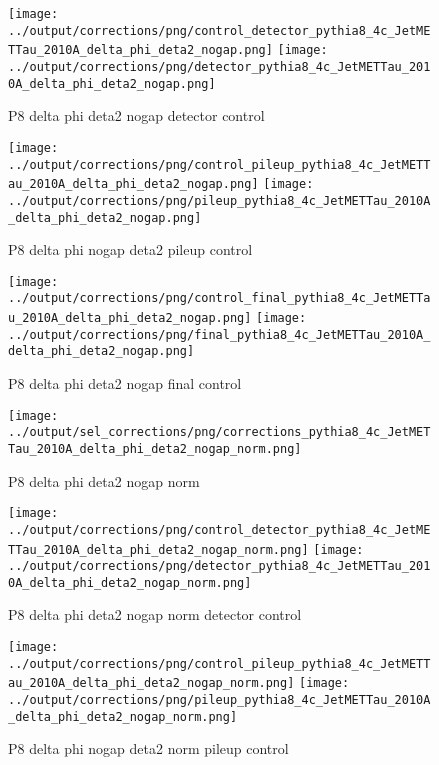 \documentclass[11pt]{book}
\begin{document}
\begin{figure}[ht]
\centering
\texttt{[image: ../output/corrections/png/control\_detector\_pythia8\_4c\_JetMETTau\_2010A\_delta\_phi\_deta2\_nogap.png]}
\texttt{[image: ../output/corrections/png/detector\_pythia8\_4c\_JetMETTau\_2010A\_delta\_phi\_deta2\_nogap.png]}
\caption{P8 delta phi deta2 nogap detector control}
\label{fig:p8_JetMETTau_2010A_delta_phi_deta2_nogap_detector_control}
\end{figure}

\begin{figure}[ht]
\centering
\texttt{[image: ../output/corrections/png/control\_pileup\_pythia8\_4c\_JetMETTau\_2010A\_delta\_phi\_deta2\_nogap.png]}
\texttt{[image: ../output/corrections/png/pileup\_pythia8\_4c\_JetMETTau\_2010A\_delta\_phi\_deta2\_nogap.png]}
\caption{P8 delta phi nogap deta2 pileup control}
\label{fig:p8_JetMETTau_2010A_delta_phi_deta2_nogap_pileup_control}
\end{figure}


\begin{figure}[ht]
\centering
\texttt{[image: ../output/corrections/png/control\_final\_pythia8\_4c\_JetMETTau\_2010A\_delta\_phi\_deta2\_nogap.png]}
\texttt{[image: ../output/corrections/png/final\_pythia8\_4c\_JetMETTau\_2010A\_delta\_phi\_deta2\_nogap.png]}
\caption{P8 delta phi deta2 nogap final control}
\label{fig:p8_JetMETTau_2010A_delta_phi_deta2_nogap_final_control}
\end{figure}

\begin{figure}[ht]
\centering
\texttt{[image: ../output/sel\_corrections/png/corrections\_pythia8\_4c\_JetMETTau\_2010A\_delta\_phi\_deta2\_nogap\_norm.png]}
\caption{P8 delta phi deta2 nogap norm}
\label{fig:p8_JetMETTau_2010A_delta_phi_deta2_nogap_norm}
\end{figure}

\begin{figure}[ht]
\centering
\texttt{[image: ../output/corrections/png/control\_detector\_pythia8\_4c\_JetMETTau\_2010A\_delta\_phi\_deta2\_nogap\_norm.png]}
\texttt{[image: ../output/corrections/png/detector\_pythia8\_4c\_JetMETTau\_2010A\_delta\_phi\_deta2\_nogap\_norm.png]}
\caption{P8 delta phi deta2 nogap norm detector control}
\label{fig:p8_JetMETTau_2010A_delta_phi_deta2_nogap_norm_detector_control}
\end{figure}

\begin{figure}[ht]
\centering
\texttt{[image: ../output/corrections/png/control\_pileup\_pythia8\_4c\_JetMETTau\_2010A\_delta\_phi\_deta2\_nogap\_norm.png]}
\texttt{[image: ../output/corrections/png/pileup\_pythia8\_4c\_JetMETTau\_2010A\_delta\_phi\_deta2\_nogap\_norm.png]}
\caption{P8 delta phi nogap deta2 norm pileup control}
\label{fig:p8_JetMETTau_2010A_delta_phi_deta2_nogap_norm_pileup_control}
\end{figure}
\end{document}
